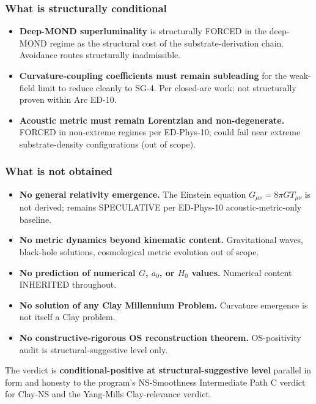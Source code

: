 \documentclass[
  11pt,a4paper]{article}
\providecommand{\tightlist}{%
  \setlength{\itemsep}{0pt}\setlength{\parskip}{0pt}}
\begin{document}
\subsubsection{What is structurally
conditional}\label{what-is-structurally-conditional}

\begin{itemize}
\tightlist
\item
  \textbf{Deep-MOND superluminality} is structurally FORCED in the
  deep-MOND regime as the structural cost of the substrate-derivation
  chain. Avoidance routes structurally inadmissible.
\item
  \textbf{Curvature-coupling coefficients must remain subleading} for
  the weak-field limit to reduce cleanly to SG-4. Per closed-arc work;
  not structurally proven within Arc ED-10.
\item
  \textbf{Acoustic metric must remain Lorentzian and non-degenerate.}
  FORCED in non-extreme regimes per ED-Phys-10; could fail near extreme
  substrate-density configurations (out of scope).
\end{itemize}

\subsubsection{What is not obtained}\label{what-is-not-obtained}

\begin{itemize}
\tightlist
\item
  \textbf{No general relativity emergence.} The Einstein equation
  \(G_{\mu\nu} = 8\pi G T_{\mu\nu}\) is not derived; remains SPECULATIVE
  per ED-Phys-10 acoustic-metric-only baseline.
\item
  \textbf{No metric dynamics beyond kinematic content.} Gravitational
  waves, black-hole solutions, cosmological metric evolution out of
  scope.
\item
  \textbf{No prediction of numerical \(G\), \(a_0\), or \(H_0\) values.}
  Numerical content INHERITED throughout.
\item
  \textbf{No solution of any Clay Millennium Problem.} Curvature
  emergence is not itself a Clay problem.
\item
  \textbf{No constructive-rigorous OS reconstruction theorem.}
  OS-positivity audit is structural-suggestive level only.
\end{itemize}

The verdict is \textbf{conditional-positive at structural-suggestive
level} parallel in form and honesty to the program's NS-Smoothness
Intermediate Path C verdict for Clay-NS and the Yang-Mills
Clay-relevance verdict.
\end{document}
